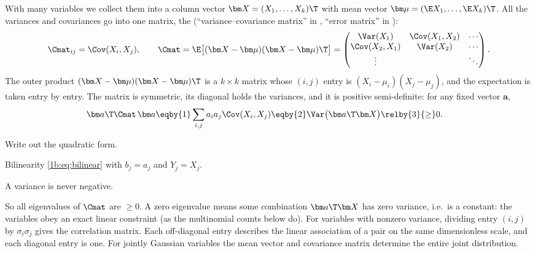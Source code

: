 With many variables we collect them into a column vector
$\bm X=(X_1,\dots,X_k)\T$ with mean vector $\bm\mu=(\E X_1,\dots,\E X_k)\T$. All
the variances and covariances go into one matrix, the
 (``variance--covariance matrix'' in
, ``error matrix'' in ):
\begin{equation}
  \Cmat_{ij}=\Cov(X_i,X_j),\qquad
  \Cmat=\E\bigl[(\bm X-\bm\mu)(\bm X-\bm\mu)\T\bigr]
  =\begin{pmatrix}
     \Var(X_1) & \Cov(X_1,X_2) & \cdots\\
     \Cov(X_2,X_1) & \Var(X_2) & \cdots\\
     \vdots & & \ddots
   \end{pmatrix}.
  \label{1b:eq:covmat}
\end{equation}
The outer product $(\bm X-\bm\mu)(\bm X-\bm\mu)\T$ is a $k\times k$ matrix whose
$(i,j)$ entry is $(X_i-\mu_i)(X_j-\mu_j)$, and the expectation is taken entry
by entry. The matrix is symmetric, its diagonal holds the variances, and it
is positive semi-definite: for any fixed vector $\bm a$,
\begin{align*}
  \bm a\T\Cmat\,\bm a
  &\eqby{1} \sum_{i,j}a_ia_j\Cov(X_i,X_j)
   \eqby{2} \Var\bigl(\bm a\T\bm X\bigr)
   \relby{3}{\ge} 0 .
\end{align*}
\begin{explain}
  \item Write out the quadratic form.
  \item Bilinearity \eqref{1b:eq:bilinear} with $b_j=a_j$ and $Y_j=X_j$.
  \item A variance is never negative.
\end{explain}
So all eigenvalues of $\Cmat$ are $\ge0$. A zero eigenvalue means some
combination $\bm a\T\bm X$ has zero variance, i.e.\ is a constant: the
variables obey an exact linear constraint (as the multinomial counts below do).
For variables with nonzero variance, dividing entry $(i,j)$ by
$\sigma_i\sigma_j$ gives the correlation matrix. Each off-diagonal entry
describes the linear association of a pair on the same dimensionless scale,
and each diagonal entry is one. For jointly Gaussian variables the mean
vector and covariance matrix determine the entire joint distribution.

